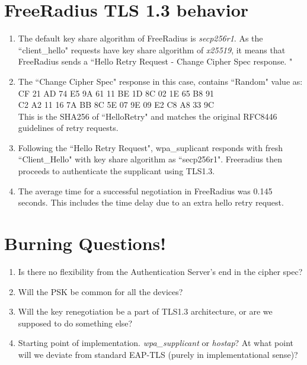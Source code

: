 \documentclass[12pt]{article}
\begin{document}
\section{FreeRadius TLS 1.3 behavior}

\begin{enumerate}
	\item{The default key share algorithm of FreeRadius is \emph{secp256r1}. As the ``client\_hello" requests have key share algorithm of \emph{x25519}, it means that FreeRadius sends a ``Hello Retry Request - Change Cipher Spec response. "}
	\item{The ``Change Cipher Spec" response in this case, contains ``Random" value as: \\   
		\qquad CF 21 AD 74 E5 9A 61 11 BE 1D 8C 02 1E 65 B8 91 \\
		C2 A2 11 16 7A BB 8C 5E 07 9E 09 E2 C8 A8 33 9C \\
		This is the SHA256 of ``HelloRetry" and matches the original RFC8446 guidelines of retry requests.
		
	 }
	\item{Following the ``Hello Retry Request", wpa\_suplicant responds with fresh ``Client\_Hello" with key share algorithm as ``secp256r1". Freeradius then proceeds to authenticate the supplicant using TLS1.3.  }
	\item{The average time for a successful negotiation in FreeRadius was 0.145 seconds. This includes the time delay due to an extra hello retry request.}
\end{enumerate}

\section{Burning Questions!}

\begin{enumerate}
	\item{Is there no flexibility from the Authentication Server's end in the cipher spec?}
	\item{Will the PSK be common for all the devices?}
	\item{Will the key renegotiation be a part of TLS1.3 architecture, or are we supposed to do something else?}
	\item{Starting point of implementation. \emph{wpa\_supplicant} or \emph{hostap}? At what point will we deviate from standard EAP-TLS (purely in implementational sense)?}
	
\end{enumerate}
\end{document}
